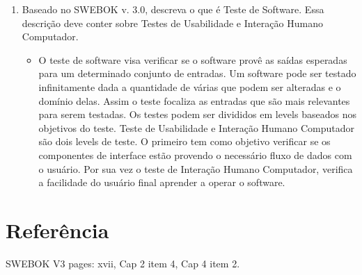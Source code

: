 \documentclass{article}
\begin{document}
\begin{enumerate}
\begin{itemize}
	\end{itemize}
\item Baseado   no   SWEBOK   v.   3.0,   descreva   o   que   é   Teste   de   Software.   Essa   descrição  
deve conter sobre Testes de Usabilidade e Interação Humano Computador. 
	\begin{itemize}
	\item[] O teste de software visa verificar se o software provê as saídas esperadas para um determinado conjunto de entradas. Um software pode ser testado infinitamente dada a quantidade de várias que podem ser alteradas e o domínio delas. Assim o teste focaliza as entradas que são mais relevantes para serem testadas. Os testes podem ser divididos em levels baseados nos objetivos do teste. Teste de Usabilidade e Interação Humano Computador são dois levels de teste. O primeiro tem como objetivo verificar se os componentes de interface estão provendo o necessário fluxo de dados com o usuário. Por sua vez o teste de Interação Humano Computador, verifica a facilidade do usuário final aprender a operar o software.
	\end{itemize}
\end{enumerate}

\newpage
\section{Referência}
SWEBOK V3 pages: xvii, Cap 2 item 4, Cap 4 item 2.
\end{document}

